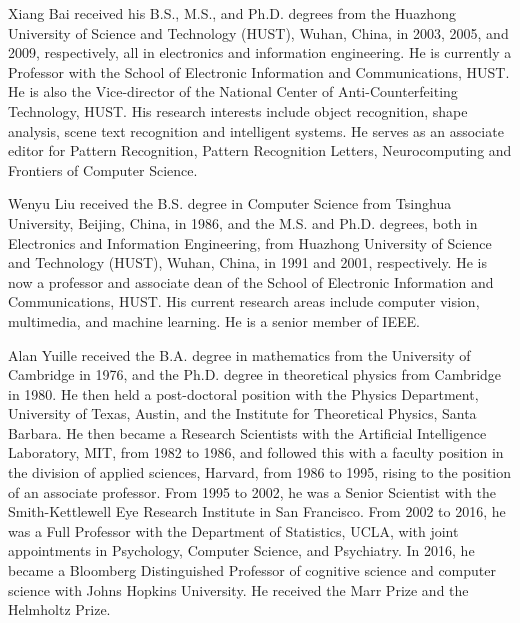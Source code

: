 \documentclass[10pt,journal,compsoc]{IEEEtran}
\begin{document}
\begin{IEEEbiography}{Xiang Bai}
received his B.S., M.S., and Ph.D. degrees from the Huazhong University of Science and Technology (HUST), Wuhan, China, in 2003, 2005, and 2009, respectively, all in electronics and information engineering. He is currently a Professor with the School of Electronic Information and Communications, HUST. He is also the Vice-director of the National Center of Anti-Counterfeiting Technology, HUST. His research interests include object recognition, shape analysis, scene text recognition and intelligent systems. He serves as an associate editor for Pattern Recognition, Pattern Recognition Letters, Neurocomputing and Frontiers of Computer Science.
\end{IEEEbiography}

\begin{IEEEbiography}{Wenyu Liu}
received the B.S. degree in Computer Science from Tsinghua University, Beijing, China, in 1986, and the M.S. and Ph.D. degrees, both in Electronics and Information Engineering, from Huazhong University of Science and Technology (HUST), Wuhan, China, in 1991 and 2001, respectively. He is now a professor and associate dean of the School of Electronic Information and Communications, HUST. His current research areas include computer vision, multimedia, and machine learning. He is a senior member of IEEE.
\end{IEEEbiography}

\begin{IEEEbiography}{Alan Yuille}
received the B.A. degree in mathematics from the University of Cambridge in 1976,
and the Ph.D. degree in theoretical physics from Cambridge in 1980.
He then held a post-doctoral position with the Physics Department, University of Texas, Austin,
and the Institute for Theoretical Physics, Santa Barbara.
He then became a Research Scientists with the Artificial Intelligence Laboratory, MIT, from 1982 to 1986,
and followed this with a faculty position in the division of applied sciences, Harvard,
from 1986 to 1995, rising to the position of an associate professor.
From 1995 to 2002, he was a Senior Scientist with the Smith-Kettlewell Eye Research Institute in San Francisco.
From 2002 to 2016, he was a Full Professor with the Department of Statistics, UCLA, with joint appointments in Psychology, Computer Science, and Psychiatry.
In 2016, he became a Bloomberg Distinguished Professor of cognitive science and computer science with Johns Hopkins University.
He received the Marr Prize and the Helmholtz Prize.
\end{IEEEbiography}
\end{document}

